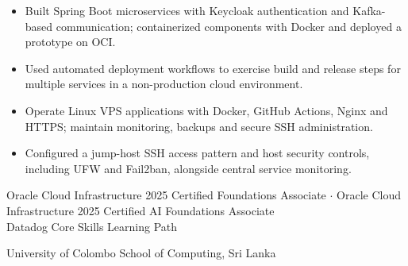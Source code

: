 \begin{itemize}
\item Built Spring Boot microservices with Keycloak authentication and Kafka-based
communication; containerized components with Docker and deployed a prototype on OCI.
\item Used automated deployment workflows to exercise build and release steps
for multiple services in a non-production cloud environment.
\end{itemize}

\begin{itemize}
\item Operate Linux VPS applications with Docker, GitHub Actions, Nginx and HTTPS;
maintain monitoring, backups and secure SSH administration.
\item Configured a jump-host SSH access pattern and host security controls,
including UFW and Fail2ban, alongside central service monitoring.
\end{itemize}

Oracle Cloud Infrastructure 2025 Certified Foundations Associate \quad$\cdot$\quad
Oracle Cloud Infrastructure 2025 Certified AI Foundations Associate\\
Datadog Core Skills Learning Path

{University of Colombo School of Computing, Sri Lanka}
